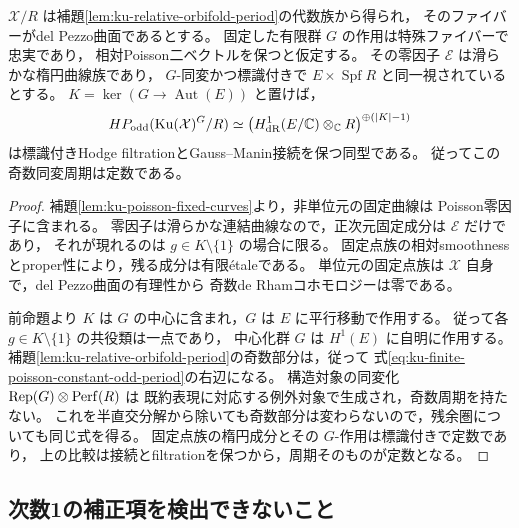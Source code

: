 \begin{proposition}[反標準曲線を固定した有限Poisson群の奇数周期]
\label{prop:ku-finite-poisson-period-constant}
$\mathcal X/R$ は補題\ref{lem:ku-relative-orbifold-period}の代数族から得られ，
そのファイバーがdel Pezzo曲面であるとする。
固定した有限群 $G$ の作用は特殊ファイバーで忠実であり，
相対Poisson二ベクトルを保つと仮定する。
その零因子 $\mathcal E$ は滑らかな楕円曲線族であり，
$G$-同変かつ標識付きで $E\times\operatorname{Spf}R$ と同一視されているとする。
$K=\ker(G\to\operatorname{Aut}(E))$ と置けば，
\begin{equation}\label{eq:ku-finite-poisson-constant-odd-period}
 HP_{\mathrm{odd}}(\operatorname{Ku}(\mathcal X)^G/R)
 \simeq
 \bigl(H^1_{\mathrm{dR}}(E/\mathbb C)\otimes_\mathbb C R\bigr)^{\oplus(|K|-1)}
\end{equation}
は標識付きHodge filtrationとGauss--Manin接続を保つ同型である。
従ってこの奇数同変周期は定数である。
\end{proposition}
\begin{proof}
補題\ref{lem:ku-poisson-fixed-curves}より，非単位元の固定曲線は
Poisson零因子に含まれる。
零因子は滑らかな連結曲線なので，正次元固定成分は $\mathcal E$ だけであり，
それが現れるのは $g\in K\setminus\{1\}$ の場合に限る。
固定点族の相対smoothnessとproper性により，残る成分は有限\'etaleである。
単位元の固定点族は $\mathcal X$ 自身で，del Pezzo曲面の有理性から
奇数de Rhamコホモロジーは零である。

前命題より $K$ は $G$ の中心に含まれ，$G$ は $E$ に平行移動で作用する。
従って各 $g\in K\setminus\{1\}$ の共役類は一点であり，
中心化群 $G$ は $H^1(E)$ に自明に作用する。
補題\ref{lem:ku-relative-orbifold-period}の奇数部分は，従って
式\eqref{eq:ku-finite-poisson-constant-odd-period}の右辺になる。
構造対象の同変化 $\operatorname{Rep}(G)\otimes\operatorname{Perf}(R)$ は
既約表現に対応する例外対象で生成され，奇数周期を持たない。
これを半直交分解から除いても奇数部分は変わらないので，残余圏についても同じ式を得る。
固定点族の楕円成分とその $G$-作用は標識付きで定数であり，
上の比較は接続とfiltrationを保つから，周期そのものが定数となる。
\end{proof}

\subsection{次数1の補正項を検出できないこと}

